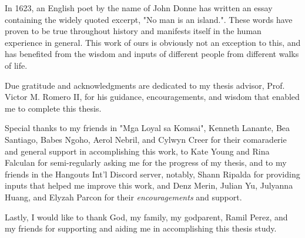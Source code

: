 
In 1623, an English poet by the name of John Donne has written an essay containing the widely quoted excerpt, "No man is an island.". These words have proven to be true throughout history and manifests itself in the human experience in general. This work of ours is obviously not an exception to this, and has benefited from the wisdom and inputs of different people from different walks of life.

Due gratitude and acknowledgments are dedicated to my thesis advisor, Prof. Victor M. Romero II, for his guidance, encouragements, and wisdom that enabled me to complete this thesis.

Special thanks to my friends in "Mga Loyal sa Komsai", Kenneth Lanante, Bea Santiago, Babes Ngoho, Aerol Nebril, and Cylwyn Creer for their comaraderie and general support in accomplishing this work, to Kate Young and Rina Falculan for semi-regularly asking me for the progress of my thesis, and to my friends in the Hangouts Int'l Discord server, notably, Shann Ripalda for providing inputs that helped me improve this work, and Denz Merin, Julian Yu, Julyanna Huang, and Elyzah Parcon for their \textit{encouragements} and support.

Lastly, I would like to thank God, my family, my godparent, Ramil Perez, and my friends for supporting and aiding me in accomplishing this thesis study.

